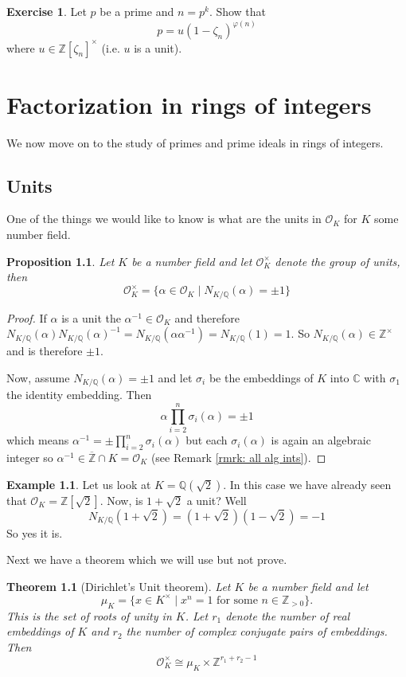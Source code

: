 \documentclass[11pt,a4paper]{report}
\theoremstyle{plain}
\newtheorem{theorem}[subsection]{Theorem}
\newtheorem{prop}[subsection]{Proposition}
\theoremstyle{definition}
\newtheorem{exmp}[subsection]{Example}
\theoremstyle{definition}
\newtheorem{question}[subsection]{Exercise}
\newcommand{\ZZ}{\mathbb{Z}}
\def\CC{\mathbb{C}}
\def\QQ{\mathbb{Q}}
\def \a{\alpha}
\def \OO {\mathcal{O}}
\def \ov{\overline}
\begin{document}
	\begin{question}\label{ques: fac of p in p-th root}
		Let $p$ be a prime and $n=p^k$. Show that \[p=u(1-\zeta_n)^{\varphi(n)}\] where $u \in \ZZ[\zeta_n]^{\times}$ (i.e. $u$ is a unit).
	\end{question}
	
	\chapter{Factorization in rings of integers}
	
	We now move on to the study of primes and prime ideals in rings of integers.
	
	\section{Units}
	
	
	
	One of the things we would like to know is what are the units in $\OO_K$ for $K$ some number field. 
	
	\begin{prop}
		Let $K$ be a number field and let $\OO_K^\times$ denote the group of units, then \[\OO_K^\times=\{\a \in \OO_K \mid N_{K/\QQ}(\a)=\pm 1\} \]
	\end{prop}
	
	\begin{proof}
		If $\a$ is a unit the $\a^{-1} \in \OO_K$ and therefore $N_{K/\QQ}(\a)N_{K/\QQ}(\a)^{-1}=N_{K/\QQ}(\a \a^{-1})=N_{K/\QQ}(1)=1$. So $N_{K/\QQ}(\a) \in \ZZ^\times$ and is therefore $\pm 1$.
		
		Now, assume $N_{K/\QQ}(\a)=\pm 1$ and let $\sigma_i$ be the embeddings of $K$ into $\CC$ with $\sigma_1$ the identity embedding. Then \[\a \prod_{i=2}^n \sigma_i(\a)=\pm 1 \] which means $\a^{-1}=\pm \prod_{i=2}^n \sigma_i(\a)$ but each $\sigma_i(\a)$ is again an algebraic integer so $ \a^{-1} \in \ov{\ZZ} \cap K=\OO_K$ (see Remark \ref{rmrk: all alg ints}).
		
	\end{proof}
	
	
	
	\begin{exmp}
		Let us look at $K=\QQ(\sqrt{2})$. In this case we have already seen that $\OO_K=\ZZ[\sqrt{2}]$. Now, is $1+\sqrt{2}$ a unit? Well \[N_{K/\QQ}(1+\sqrt{2})=(1+\sqrt{2})(1-\sqrt{2})=-1\] So yes it is.
	\end{exmp}
	
	Next we have a theorem which we will use but not prove.
	\begin{theorem}[Dirichlet's Unit theorem]\label{thm: dir unit theorem}
		Let $K$ be a number field and let \[\mu_K=\{x \in K^\times \mid x^n=1 \text{ for some } n  \in \ZZ_{> 0}\}.\] This is the set of roots of unity in $K$. Let $r_1$ denote the number of real embeddings of $K$ and $r_2$ the number of complex conjugate pairs of embeddings. Then \[\OO_K^{\times} \cong \mu_K \times \ZZ^{r_1+r_2-1}\]
	\end{theorem}
	
\end{document}
